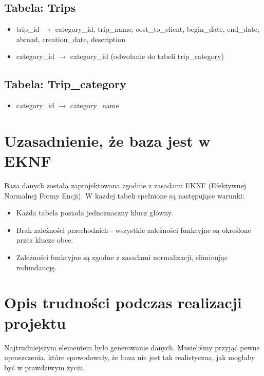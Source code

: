\documentclass{article}
\begin{document}
\subsection{Tabela: Trips}
\begin{itemize}
    \item trip\_id $\rightarrow$ category\_id, trip\_name, cost\_to\_client, begin\_date, end\_date, abroad, creation\_date, description
    \item category\_id $\rightarrow$ category\_id (odwołanie do tabeli trip\_category)
\end{itemize}
\subsection{Tabela: Trip\_category}
\begin{itemize}
    \item category\_id $\rightarrow$ category\_name
\end{itemize}

\newpage

\section{Uzasadnienie, że baza jest w EKNF}
Baza danych została zaprojektowana zgodnie z zasadami EKNF (Efektywnej Normalnej Formy Encji). W każdej tabeli spełnione są następujące warunki:
\begin{itemize}
    \item Każda tabela posiada jednoznaczny klucz główny.
    \item Brak zależności przechodnich - wszystkie zależności funkcyjne są określone przez klucze obce.
    \item Zależności funkcyjne są zgodne z zasadami normalizacji, eliminując redundancję.
\end{itemize}

\section{Opis trudności podczas realizacji projektu}
Najtrudniejszym elementem było generowanie danych. Musieliśmy przyjąć pewne uproszczenia, które spowodowały, że baza nie jest tak realistyczna, jak mogłaby być w prawdziwym życiu. 
\end{document}
